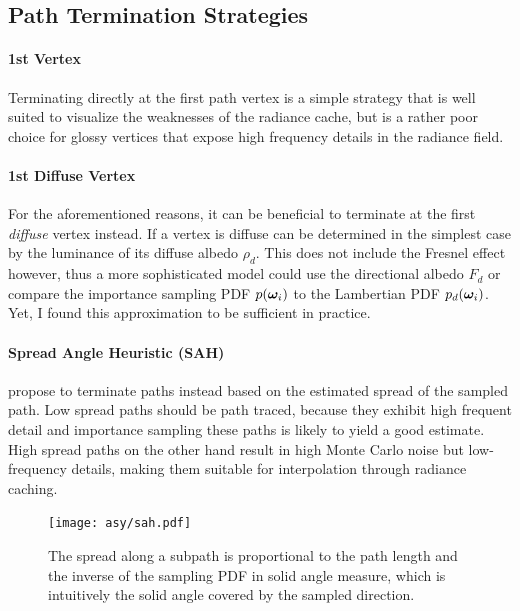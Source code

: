 \subsection{Path Termination Strategies}
\label{sec:path_termination}
\paragraph{1st Vertex}
\label{par:pt_1st_vertex}
Terminating directly at the first path vertex is a simple strategy that is well suited to visualize the weaknesses of the radiance cache, but is a rather poor choice for glossy vertices that expose high frequency details in the radiance field.

\paragraph{1st Diffuse Vertex}
\label{par:pt_1st_diffuse}
For the aforementioned reasons, it can be beneficial to terminate at the first \emph{diffuse} vertex instead.
If a vertex is diffuse can be determined in the simplest case by the luminance of its diffuse albedo $\rho_d$.
This does not include the Fresnel effect however, thus a more sophisticated model could use the directional albedo $F_d$ or compare the importance sampling PDF $p({\bm{\omega}_i})$ to the Lambertian PDF $p_d({\bm{\omega}_i})$.
Yet, I found this approximation to be sufficient in practice.

\paragraph{Spread Angle Heuristic (SAH)}
\label{par:pt_sah}
\textcite{muller2021} propose to terminate paths instead based on the estimated spread of the sampled path.
Low spread paths should be path traced, because they exhibit high frequent detail and importance sampling these paths is likely to yield a good estimate.
High spread paths on the other hand result in high Monte Carlo noise but low-frequency details, making them suitable for interpolation through radiance caching.

\begin{figure}[htb!]
    \centering
    \texttt{[image: asy/sah.pdf]}
    \caption{The spread along a subpath is proportional to the path length and the inverse of the sampling PDF in solid angle measure, which is intuitively the solid angle covered by the sampled direction.}
    \label{fig:sah}
\end{figure}

